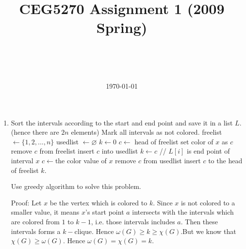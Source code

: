 \documentclass[a4paper,12pt]{article}
\title{CEG5270 Assignment 1 (2009 Spring)}
\author{\myname\\\mymail\\\CSE\\\CUHK}
\date{\today}
\begin{document}
\maketitle
\begin{enumerate}
\item

\begin{algorithm}[htbp!]
\begin{algorithmic}[1]
\STATE Sort the intervals according to the start and end point and save it in a list $L$.(hence there are $2n$ elements)
\STATE Mark all intervals as not colored.
\STATE freelist $\leftarrow \{1,2,...,n\}$
\STATE usedlist $\leftarrow \varnothing$
\STATE $k \leftarrow 0$ 
		\STATE $c \leftarrow $ head of freelist
		\STATE set color of $x$ as $c$
		\STATE remove $c$ from freelist
		\STATE insert $c$ into usedlist
			\STATE $k \leftarrow c$
		\ENDIF
	\ELSE 
		\STATE // $L[i]$ is end point of interval $x$
		\STATE $c \leftarrow $the color value of $x$
		\STATE remove $c$ from usedlist
		\STATE insert $c$ to the head of freelist
	\ENDIF
\ENDFOR
\RETURN  $k$.
\end{algorithmic}
\end{algorithm}
Use greedy algorithm to solve this problem.

Proof: Let $x$ be the vertex which is colored to $k$. Since $x$ is not colored to a smaller value,
it means $x$'s start point $a$ intersects with the intervals which are colored from $1$ to $k-1$, 
i.e. those intervals includes $a$. Then these intervals forms a $k-$clique. 
Hence $\omega(G) \geq k \geq \chi(G)$.But we know that $\chi(G) \geq \omega(G)$. 
Hence $\omega(G) = \chi(G) = k$.


\end{enumerate}
\end{document}

